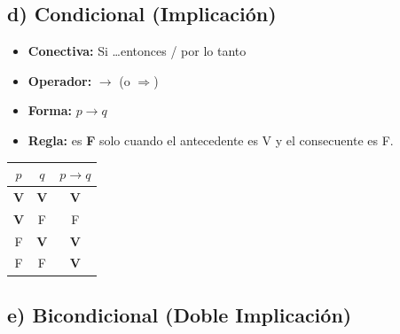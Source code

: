 \documentclass[12pt,a4paper]{article}
\newcommand{\TV}[1]{\textbf{#1}}   %
\begin{document}
\bigskip

\subsection{d) Condicional (Implicación)}

\begin{minipage}{0.55\linewidth}
\begin{itemize}[leftmargin=*]
  \item \textbf{Conectiva:} Si \ldots entonces / por lo tanto
  \item \textbf{Operador:} $\rightarrow$ (o $\Rightarrow$)
  \item \textbf{Forma:} $p \rightarrow q$
  \item \textbf{Regla:} es \textbf{F} solo cuando el antecedente es V y el consecuente es F.
\end{itemize}
\end{minipage}%
\hfill
\begin{minipage}{0.38\linewidth}
\centering
\begin{tabular}{cc|c}
\toprule
$p$ & $q$ & $p \rightarrow q$ \\
\midrule
\TV{V} & \TV{V} & \TV{V} \\
\TV{V} & F      & F      \\
F      & \TV{V} & \TV{V} \\
F      & F      & \TV{V} \\
\bottomrule
\end{tabular}
\end{minipage}

\bigskip

\subsection{e) Bicondicional (Doble Implicación)}
\end{document}
